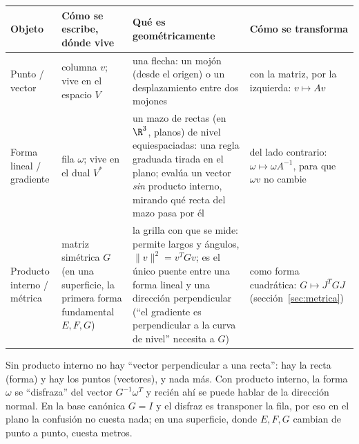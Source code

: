 {\small
\begin{tabularx}{\textwidth}{>{\bfseries\raggedright\arraybackslash}p{27mm}>{\raggedright\arraybackslash}p{30mm}YY}
\toprule
Objeto & Cómo se escribe, dónde vive & Qué es geométricamente & Cómo se transforma\\
\midrule
Punto / vector & columna \(v\); vive en el espacio \(V\) &
una flecha: un mojón (desde el origen) o un desplazamiento entre dos mojones &
con la matriz, por la izquierda: \(v\mapsto Av\)\\
Forma lineal / gradiente & fila \(\omega\); vive en el dual \(V^{*}\) &
un mazo de rectas (en \(\R^3\), planos) de nivel equiespaciadas: una regla graduada
tirada en el plano; evalúa un vector \emph{sin} producto interno, mirando qué recta del
mazo pasa por él &
del lado contrario: \(\omega\mapsto\omega A^{-1}\), para que \(\omega v\) no cambie\\
Producto interno / métrica & matriz simétrica \(G\) (en una superficie, la primera forma
fundamental \(E,F,G\)) &
la grilla con que se mide: permite largos y ángulos, \(\|v\|^2=v^TGv\); es el único
puente entre una forma lineal y una dirección perpendicular (``el gradiente es
perpendicular a la curva de nivel'' necesita a \(G\)) &
como forma cuadrática: \(G\mapsto J^TGJ\) (sección~\ref{sec:metrica})\\
\bottomrule
\end{tabularx}
}

Sin producto interno no hay ``vector perpendicular a una recta'': hay la recta (forma) y
hay los puntos (vectores), y nada más. Con producto interno, la forma \(\omega\) se
``disfraza'' del vector \(G^{-1}\omega^T\) y recién ahí se puede hablar de la dirección
normal. En la base canónica \(G=I\) y el disfraz es transponer la fila, por eso en el
plano la confusión no cuesta nada; en una superficie, donde \(E,F,G\) cambian de punto a
punto, cuesta metros.

